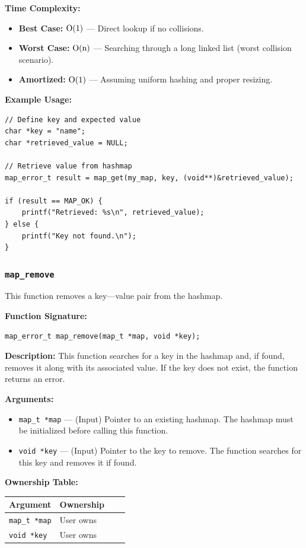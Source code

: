 \documentclass[titlepage]{article}
\begin{document}
\textbf{Time Complexity:}
\begin{itemize}
\item \textbf{Best Case:} \( $O(1)$ \) --- Direct lookup if no collisions.
\item \textbf{Worst Case:} \( $O(n)$ \) --- Searching through a long linked list (worst collision scenario).
\item \textbf{Amortized:} \( $O(1)$ \) --- Assuming uniform hashing and proper resizing.
\end{itemize}

\textbf{Example Usage:}
\begin{verbatim}
// Define key and expected value
char *key = "name";
char *retrieved_value = NULL;

// Retrieve value from hashmap
map_error_t result = map_get(my_map, key, (void**)&retrieved_value);

if (result == MAP_OK) {
    printf("Retrieved: %s\n", retrieved_value);
} else {
    printf("Key not found.\n");
}
\end{verbatim}


\subsubsection{\texttt{map\_remove}} %

This function removes a key---value pair from the hashmap.

\textbf{Function Signature:}
\begin{verbatim}
map_error_t map_remove(map_t *map, void *key);
\end{verbatim}

\textbf{Description:}
This function searches for a key in the hashmap and, if found, removes it along with its associated value.
If the key does not exist, the function returns an error.

\textbf{Arguments:}
\begin{itemize}
    \item \texttt{map\_t *map} --- (Input) Pointer to an existing hashmap.
    The hashmap must be initialized before calling this function.

    \item \texttt{void *key} --- (Input) Pointer to the key to remove.
    The function searches for this key and removes it if found.
\end{itemize}

\textbf{Ownership Table:}
\begin{center}
\begin{tabular}{@{} l l c c @{} }
\toprule
\textbf{Argument} & \textbf{Ownership}  \\
\midrule
\texttt{map\_t *map} & User owns  \\
\texttt{void *key} & User owns  \\
\bottomrule
\end{tabular}
\end{center}
\end{document}
